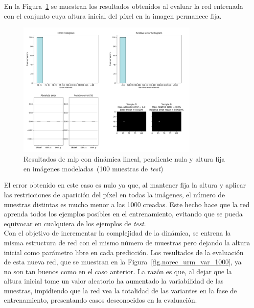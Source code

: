 En la Figura~\ref{fig.norec_urm_fix_1000} se muestran los resultados obtenidos al evaluar la red entrenada con el conjunto cuya altura inicial del píxel en la imagen permanece fija.

\begin{figure}[H]
		\begin{center}
			\includegraphics[width=0.8\textwidth]{ figures/test_mod/NOREC/URM_fix_1000.png}
			\caption{Resultados de \acrshort{mlp} con dinámica lineal, pendiente nula y altura fija en imágenes modeladas~(100 muestras de \textit{test})}
			\label{fig.norec_urm_fix_1000}
		\end{center}
\end{figure}
\vspace{-10pt}

El error obtenido en este caso es nulo ya que, al mantener fija la altura y aplicar las restricciones de aparición del píxel en todas la imágenes, el número de muestras distintas es mucho menor a las 1000 creadas. Este hecho hace que la red aprenda todos los ejemplos posibles en el entrenamiento, evitando que se pueda equivocar en cualquiera de los ejemplos de \textit{test}.\\

Con el objetivo de incrementar la complejidad de la dinámica, se entrena la misma estructura de red con el mismo número de muestras pero dejando la altura inicial como parámetro libre en cada predicción. Los resultados de la evaluación de esta nueva red, que se muestran en la Figura~\ref{fig.norec_urm_var_1000}, ya no son tan buenos como en el caso anterior. La razón es que, al dejar que la altura inicial tome un valor aleatorio ha aumentado la variabilidad de las muestras, impidiendo que la red vea la totalidad de las variantes en la fase de entrenamiento, presentando casos desconocidos en la evaluación.

